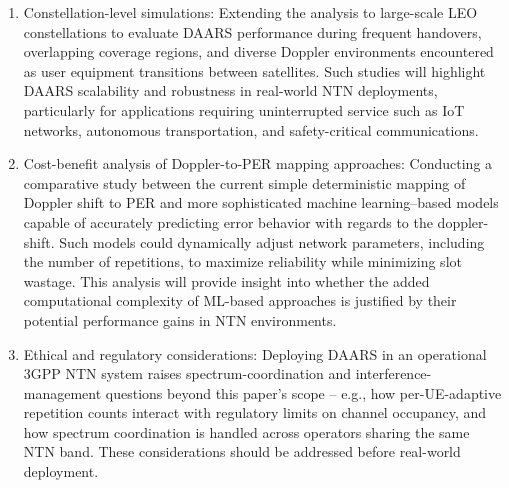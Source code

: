 \documentclass[conference]{IEEEtran}
\begin{document}
\begin{enumerate}
    \item Constellation-level simulations: Extending the analysis to large-scale LEO constellations to evaluate DAARS performance during frequent handovers, overlapping coverage regions, and diverse Doppler environments encountered as user equipment transitions between satellites. Such studies will highlight DAARS scalability and robustness in real-world NTN deployments, particularly for applications requiring uninterrupted service such as IoT networks, autonomous transportation, and safety-critical communications.
    \item Cost-benefit analysis of Doppler-to-PER mapping approaches: Conducting a comparative study between the current simple deterministic mapping of Doppler shift to PER and more sophisticated machine learning–based models capable of accurately predicting error behavior with regards to the doppler-shift. Such models could dynamically adjust network parameters, including the number of repetitions, to maximize reliability while minimizing slot wastage. This analysis will provide insight into whether the added computational complexity of ML-based approaches is justified by their potential performance gains in NTN environments.
    \item Ethical and regulatory considerations: Deploying DAARS in an operational 3GPP NTN system raises spectrum-coordination and interference-management questions beyond this paper's scope -- e.g., how per-UE-adaptive repetition counts interact with regulatory limits on channel occupancy, and how spectrum coordination is handled across operators sharing the same NTN band. These considerations should be addressed before real-world deployment.
\end{enumerate}

\label{sec:conclusion}
\end{document}

